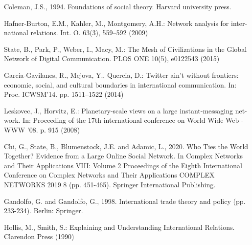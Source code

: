\documentclass[12pt]{article}
\begin{document}
Coleman, J.S., 1994. Foundations of social theory. Harvard university press.

Hafner-Burton, E.M., Kahler, M., Montgomery, A.H.: Network analysis for inter-
national relations. Int. O. 63(3), 559–592 (2009)

State, B., Park, P., Weber, I., Macy, M.: The Mesh of Civilizations in the Global
Network of Digital Communication. PLOS ONE 10(5), e0122543 (2015)

Garcia-Gavilanes, R., Mejova, Y., Quercia, D.: Twitter ain’t without frontiers:
economic, social, and cultural boundaries in international communication. In: Proc.
ICWSM’14. pp. 1511–1522 (2014)

Leskovec, J., Horvitz, E.: Planetary-scale views on a large instant-messaging net-
work. In: Proceeding of the 17th international conference on World Wide Web -
WWW ’08. p. 915 (2008)

Chi, G., State, B., Blumenstock, J.E. and Adamic, L., 2020. Who Ties the World Together? Evidence from a Large Online Social Network. In Complex Networks and Their Applications VIII: Volume 2 Proceedings of the Eighth International Conference on Complex Networks and Their Applications COMPLEX NETWORKS 2019 8 (pp. 451-465). Springer International Publishing.

Gandolfo, G. and Gandolfo, G., 1998. International trade theory and policy (pp. 233-234). Berlin: Springer.

Hollis, M., Smith, S.: Explaining and Understanding International Relations.
Clarendon Press (1990)
\end{document}
